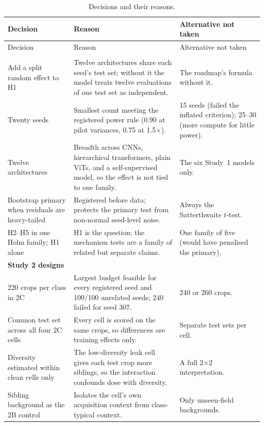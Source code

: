 {\small
\begin{longtable}{p{}p{}p{}}
\caption{Decisions and their reasons.}\label{r:tab:decisions}\\
\toprule
Decision & Reason & Alternative not taken \\
\midrule
\endfirsthead
\toprule
Decision & Reason & Alternative not taken \\
\midrule
\endhead
\bottomrule
\endfoot
\multicolumn{3}{l}{\textbf{Study 2 statistics}} \\
Add a split random effect to H1 & Twelve architectures share each seed's test set; without it the model treats twelve evaluations of one test set as independent. & The roadmap's formula without it. \\
Twenty seeds & Smallest count meeting the registered power rule (0.90 at pilot variances, 0.75 at 1.5$\times$). & 15 seeds (failed the inflated criterion); 25--30 (more compute for little power). \\
Twelve architectures & Breadth across CNNs, hierarchical transformers, plain ViTs, and a self-supervised model, so the effect is not tied to one family. & The six Study~1 models only. \\
Bootstrap primary when residuals are heavy-tailed & Registered before data; protects the primary test from non-normal seed-level noise. & Always the Satterthwaite $t$-test. \\
H2--H5 in one Holm family; H1 alone & H1 is the question; the mechanism tests are a family of related but separate claims. & One family of five (would have penalised the primary). \\
\multicolumn{3}{l}{\textbf{Study 2 designs}} \\
220 crops per class in 2C & Largest budget feasible for every registered seed and 100/100 unrelated seeds; 240 failed for seed 307. & 240 or 260 crops. \\
Common test set across all four 2C cells & Every cell is scored on the same crops, so differences are training effects only. & Separate test sets per cell. \\
Diversity estimated within clean cells only & The low-diversity leak cell gives each test crop more siblings, so the interaction confounds dose with diversity. & A full 2$\times$2 interpretation. \\
Sibling background as the 2B control & Isolates the cell's own acquisition context from class-typical context. & Only unseen-field backgrounds. \\

\end{longtable}}
